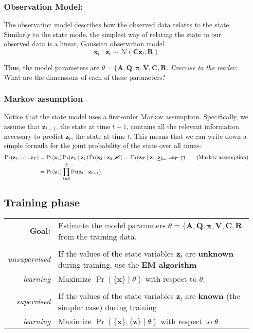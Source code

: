 \documentclass[11pt]{article}
\newcommand{\xb}{\mathbf{x}}
\newcommand{\zb}{\mathbf{z}}
\newcommand{\Ab}{\mathbf{A}}
\newcommand{\Qb}{\mathbf{Q}}
\newcommand{\Cb}{\mathbf{C}}
\newcommand{\Rb}{\mathbf{R}}
\begin{document}
\subsubsection*{Observation Model:} The observation model describes how the
observed data relates to the state. Similarly to the state mode, the simplest
way of relating the state to our observed data is a linear, Gaussian observation
model.
\begin{equation}
  \xb_t \mid \zb_t \sim \mathcal{N}(\Cb \zb_t, \Rb)
  \label{eqn:observations}
\end{equation}

Thus, the model parameters are $\theta = \{\Ab, \Qb, \symbf{\pi}, \mathbf{V},
\Cb, \Rb$. \textit{Exercise to the reader:} What are the dimensions of each of
these parameters?

\subsubsection*{Markov assumption}
Notice that the state model uses a first-order Markov assumption. Specifically,
we assume that $\zb_{t-1}$, the state at time $t-1$, contains all the relevant
information necessary to predict $\zb_t$, the state at time $t$. This means
that we can write down a simple formula for the joint probability of the state
over all times:
\begin{align*}
  \Pr(\zb_1, \ldots, \zb_T) &= \Pr(\zb_1) \Pr(\zb_2 \mid \zb_1)
      \Pr(\zb_3 \mid \zb_2, \cancel{\zb1}) \ldots
      \Pr(\zb_T \mid \zb_1, \cancel{\zb_2 \ldots \zb_{T-1}})
          \tag{Markov assumption} \\
      &= \Pr(\zb_1) \prod_{t=2}^T \Pr(\zb_t \mid \zb_{t-1})
\end{align*}

\subsection{Training phase}
\begin{tabular}{r l}
  \textbf{Goal:} & Estimate the model parameters $\theta = \{\Ab, \Qb,
  \symbf{\pi},\mathbf{V}, \Cb, \Rb$ from the training data. \\
  \\
  \textit{unsupervised} & If the values of the state variables $\zb_t$
  are \textbf{unknown} during training, use the \textbf{EM algorithm} \\
  \textit{learning} & Maximize $\Pr(\{\xb\} \mid \theta)$ with respect to
  $\theta$. \\
  \\
  \textit{supervised} & If the values of the state variables $\zb_t$
  are \textbf{known} (the simpler case) during training \\
  \textit{learning} & Maximize $\Pr(\{\xb\}, \{\zb\} \mid \theta)$ with
  respect to $\theta$. \\
\end{tabular}
\end{document}

